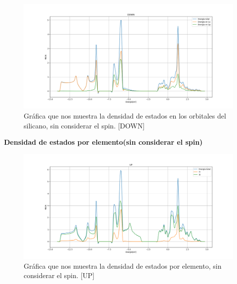 \begin{frame}
    \begin{figure}[H]
        \centering
        \includegraphics[scale=0.3]{images_silicano/Densidad_estados_sin_spin_down.png}
        \caption{Gráfica que nos muestra la densidad de estados en los orbitales del silicano, sin considerar el spin. [DOWN]}
    \end{figure}
\end{frame}

\vspace{0.5cm}

\begin{frame}
    \textbf{Densidad de estados por elemento(sin considerar el spin)}
    \begin{figure}[H]
        \centering
        \includegraphics[scale=0.3]{images_silicano/Densidad_estados_sin_spin_up_elementos.png}
        \caption{Gráfica que nos muestra la densidad de estados por elemento, sin considerar el spin. [UP]}
    \end{figure}
\end{frame}

